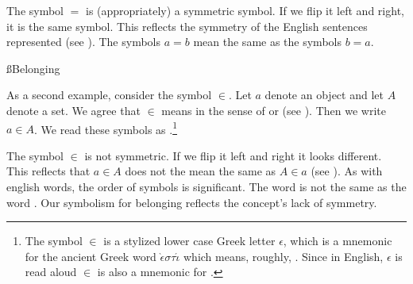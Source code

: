 The symbol $=$ is (appropriately) a symmetric symbol.
If we flip it left and right, it is the same symbol.
This reflects the symmetry of the English sentences represented (see ).
The symbols $a = b$ mean the same as the symbols $b = a$.

%

\ss{Belonging}

As a second example, consider the symbol $\in$.
Let $a$ denote an object and let $A$ denote a set.
We agree that $\in$ means  in the sense of  or  (see ).
Then we write $a \in A$.
We read these symbols as .\footnote{The symbol $\in$ is a stylized lower case Greek letter $\epsilon$, which is a mnemonic for the ancient Greek word $\grave{\epsilon} \sigma \tau \acute{\iota}$ which means, roughly, .
Since in English, $\epsilon$ is read aloud  $\in$ is also a mnemonic for .}

The symbol $\in$ is not symmetric.
If we flip it left and right it looks different.
This reflects that $a \in A$ does not the mean the same as $A \in a$ (see ).
As with english words, the order of symbols is significant.
The word  is not the same as the word .
Our symbolism for belonging reflects the concept's lack of symmetry.


